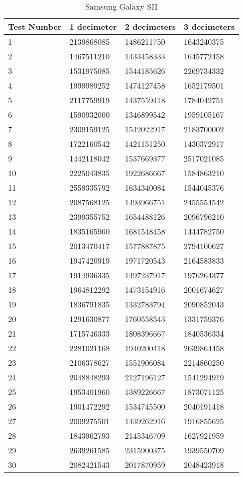 	\begin{table}[ht!]
    		\caption{Samsung Galaxy SII} \label{tab:distamceGoogleGlassFull}
		\centering \begin{tabularx}{\textwidth}{l|X|X|X} \hline
		Test Number & \textbf{1 decimeter} & \textbf{2 decimeters} & \textbf{3 decimeters} \\ \hline \hline
		
		1&	2139868085	&	1486211750	&	1643240375	\\ \hline
		2&	1467511210	&	1433458333	&	1645772458	\\ \hline
		3&	1531975085	&	1544185626	&	2269734332	\\ \hline
		4&	1999989252	&	1474127458	&	1652179501	\\ \hline
		5&	2117759919	&	1437559418	&	1784042751	\\ \hline
		6&	1590932000	&	1346899542	&	1959105167	\\ \hline
		7&	2309159125	&	1542022917	&	2183700002	\\ \hline
		8&	1722160542	&	1421151250	&	1430372917	\\ \hline
		9&	1442118042	&	1537669377	&	2517021085	\\ \hline
		10&	2225043835	&	1922686667	&	1584863210	\\ \hline
		11&	2559335792	&	1634340084	&	1544045376	\\ \hline
		12&	2087568125	&	1493966751	&	2455554542	\\ \hline
		13&	2399355752	&	1654488126	&	2096796210	\\ \hline
		14&	1835165960	&	1681548458	&	1444782750	\\ \hline
		15&	2013470417	&	1577887875	&	2794100627	\\ \hline
		16&	1947420919	&	1971720543	&	2164583833	\\ \hline
		17&	1914936335	&	1497237917	&	1976264377	\\ \hline
		18&	1964812292	&	1473154916	&	2001674627	\\ \hline
		19&	1836791835	&	1332783794	&	2090852043	\\ \hline
		20&	1291630877	&	1760558543	&	1331759376	\\ \hline
		21&	1715746333	&	1808396667	&	1840536334	\\ \hline
		22&	2281021168	&	1940200418	&	2039864458	\\ \hline
		23&	2106378627	&	1551906084	&	2214860250	\\ \hline
		24&	2048848293	&	2127196127	&	1541294919	\\ \hline
		25&	1953401960	&	1389226667	&	1873071125	\\ \hline
		26&	1901472292	&	1534745500	&	2040191418	\\ \hline
		27&	2009275501	&	1439262916	&	1916855625	\\ \hline
		28&	1843962793	&	2145346709	&	1627921959	\\ \hline
		29&	2639261585	&	2315900375	&	1939550709	\\ \hline
		30&	2082421543	&	2017870959	&	2048423918	\\ \hline
		
		\end{tabularx}
	\end{table}
	
